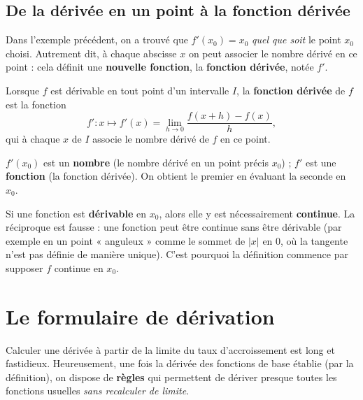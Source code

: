 \documentclass[11pt,a4paper]{article}
\newcommand{\limh}{\lim_{h\to 0}}
\begin{document}
\subsection{De la dérivée en un point à la fonction dérivée}

Dans l'exemple précédent, on a trouvé que $f'(x_0)=x_0$ \emph{quel que soit} le point $x_0$ choisi.
Autrement dit, à chaque abscisse $x$ on peut associer le nombre dérivé en ce point : cela définit une
\textbf{nouvelle fonction}, la \textbf{fonction dérivée}, notée $f'$.

\begin{definition}
Lorsque $f$ est dérivable en tout point d'un intervalle $I$, la \textbf{fonction dérivée} de $f$ est
la fonction
\[
   f' : x\longmapsto f'(x)=\limh\frac{f(x+h)-f(x)}{h},
\]
qui à chaque $x$ de $I$ associe le nombre dérivé de $f$ en ce point.
\end{definition}

\begin{attention}
$f'(x_0)$ est un \textbf{nombre} (le nombre dérivé en un point précis $x_0$) ; $f'$ est une
\textbf{fonction} (la fonction dérivée). On obtient le premier en évaluant la seconde en $x_0$.
\end{attention}

\begin{remarque}
Si une fonction est \textbf{dérivable} en $x_0$, alors elle y est nécessairement \textbf{continue}.
La réciproque est fausse : une fonction peut être continue sans être dérivable (par exemple en un
point « anguleux » comme le sommet de $|x|$ en $0$, où la tangente n'est pas définie de manière
unique). C'est pourquoi la définition commence par supposer $f$ continue en $x_0$.
\end{remarque}

\section{Le formulaire de dérivation}
\label{sec:formules}
Calculer une dérivée à partir de la limite du taux d'accroissement est long et fastidieux. Heureusement,
une fois la dérivée des fonctions de base établie (par la définition), on dispose de \textbf{règles}
qui permettent de dériver presque toutes les fonctions usuelles \emph{sans recalculer de limite}.
\end{document}
